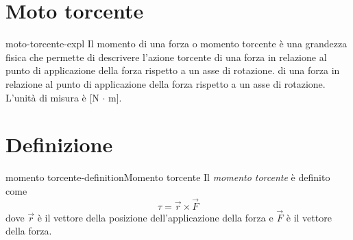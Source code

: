 \documentclass[preview]{standalone}
\begin{document}
\genpage

\section{Moto torcente}

\begin{snippet}{moto-torcente-expl}
    Il momento di una forza o momento torcente è una grandezza fisica che permette di descrivere l'azione torcente di una forza in relazione al punto di applicazione della forza rispetto a un asse di rotazione.
di una forza in relazione al punto di applicazione della forza rispetto a un asse di rotazione.
\\ L'unità di misura è [N \(\cdot\) m].
\end{snippet}

\section{Definizione}

\begin{snippetdefinition}{momento torcente-definition}{Momento torcente}
    Il \textit{momento torcente} è definito come
    \[ \tau = \vec{r} \times \vec{F} \]
    dove \(\vec{r}\) è il vettore della posizione dell'applicazione della forza
    e \(\vec{F}\) è il vettore della forza.
\end{snippetdefinition}
\end{document}
